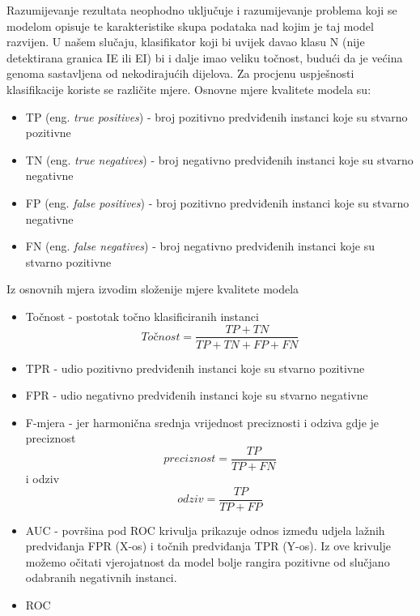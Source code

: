Razumijevanje rezultata neophodno uključuje i razumijevanje problema koji se modelom opisuje te karakteristike skupa podataka nad kojim je taj model razvijen. U našem slučaju, klasifikator koji bi uvijek davao klasu N (nije detektirana granica IE ili EI) bi i dalje imao veliku točnost, budući da je većina genoma sastavljena od nekodirajućih dijelova. Za procjenu uspješnosti klasifikacije koriste se različite mjere. 
Osnovne mjere kvalitete modela su:
\begin{itemize}
   \item TP (eng. \textit{true positives}) - broj pozitivno predviđenih instanci koje su stvarno pozitivne
   \item TN (eng. \textit{true negatives}) - broj negativno predviđenih instanci koje su stvarno negativne
   \item FP (eng. \textit{false positives}) - broj pozitivno predviđenih instanci koje su stvarno negativne
   \item FN (eng. \textit{false negatives}) - broj negativno predviđenih instanci koje su stvarno pozitivne
\end{itemize}
Iz osnovnih mjera izvodim složenije mjere kvalitete modela
\begin{itemize}
   \item Točnost - postotak točno klasificiranih instanci 
   \begin{equation}
   Točnost = \frac{TP+TN}{TP+TN+FP+FN}
   \end{equation}
   \item TPR - udio pozitivno predviđenih instanci koje su stvarno pozitivne
   \item FPR - udio negativno predviđenih instanci koje su stvarno negativne
   \item F-mjera - jer harmonična srednja vrijednost preciznosti i odziva gdje je preciznost
   \begin{equation}
    preciznost = \frac{TP}{TP+FN}
   \end{equation}
   i odziv
   \begin{equation}
    odziv = \frac{TP}{TP+FP}
   \end{equation}
   \item AUC - površina pod ROC krivulja prikazuje odnos između udjela lažnih predviđanja FPR (X-os) i točnih predviđanja TPR (Y-os). Iz ove krivulje možemo očitati vjerojatnost da model bolje rangira pozitivne od slučjano odabranih negativnih instanci.
   \item ROC
\end{itemize}

